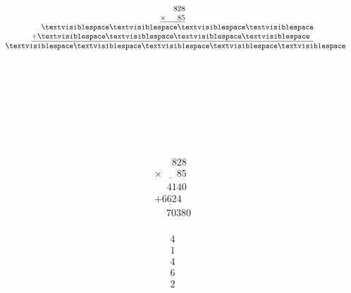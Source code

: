 \begin{minipage}[t]{0.3\linewidth}
\begin{align*}\begin{array}{c}
\phantom{
\times00
}
828\\
\underline{
\times
\phantom{
000
}
85
}\\
\phantom{
+0
}
\textvisiblespace
\textvisiblespace
\textvisiblespace
\textvisiblespace
\\
\underline{
+
\textvisiblespace
\textvisiblespace
\textvisiblespace
\textvisiblespace
\phantom0
}
\\
\phantom{+}
\textvisiblespace
\textvisiblespace
\textvisiblespace
\textvisiblespace
\textvisiblespace
\end{array}\end{align*}
\end{minipage}
\begin{minipage}[t]{0.05\linewidth}
\begin{align*}\begin{array}{c}
\textvisiblespace
\\
\textvisiblespace
\\
\textvisiblespace
\\
\textvisiblespace
\\
\textvisiblespace
\end{array}\end{align*}
\end{minipage}
\begin{minipage}[t]{0.05\linewidth}
\begin{align*}\begin{array}{c}
\textvisiblespace
\end{array}\end{align*}
\end{minipage}
\begin{minipage}[t]{0.3\linewidth}
\begin{align*}\begin{array}{c}
\phantom{
\times00
}
828\\
\underline{
\times
\phantom{
000
}
85
}\\
\phantom{
+0
}
4140
\\
\underline{
+
6624
\phantom0
}
\\
\phantom{+}
70380
\end{array}\end{align*}
\end{minipage}
\begin{minipage}[t]{0.05\linewidth}
\begin{align*}\begin{array}{c}
4
\\
1
\\
4
\\
6
\\
2
\end{array}\end{align*}
\end{minipage}
